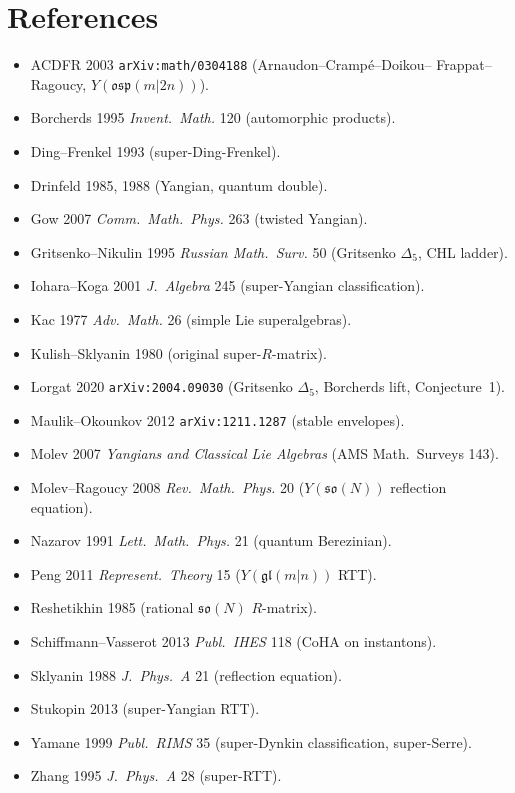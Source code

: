 \documentclass{article}
\providecommand{\fgl}{\mathfrak{gl}}
\providecommand{\fso}{\mathfrak{so}}
\providecommand{\fosp}{\mathfrak{osp}}
\theoremstyle{definition}
\begin{document}
\section*{References}

\begin{itemize}
\item ACDFR 2003 \texttt{arXiv:math/0304188} (Arnaudon--Cramp\'e--Doikou--
  Frappat--Ragoucy, $Y(\fosp(m|2n))$).
\item Borcherds 1995 \emph{Invent.\ Math.} 120 (automorphic products).
\item Ding--Frenkel 1993 (super-Ding-Frenkel).
\item Drinfeld 1985, 1988 (Yangian, quantum double).
\item Gow 2007 \emph{Comm.\ Math.\ Phys.} 263 (twisted Yangian).
\item Gritsenko--Nikulin 1995 \emph{Russian Math.\ Surv.} 50 (Gritsenko
  $\Delta_5$, CHL ladder).
\item Iohara--Koga 2001 \emph{J.\ Algebra} 245 (super-Yangian
  classification).
\item Kac 1977 \emph{Adv.\ Math.} 26 (simple Lie superalgebras).
\item Kulish--Sklyanin 1980 (original super-$R$-matrix).
\item Lorgat 2020 \texttt{arXiv:2004.09030} (Gritsenko $\Delta_5$,
  Borcherds lift, Conjecture~1).
\item Maulik--Okounkov 2012 \texttt{arXiv:1211.1287} (stable envelopes).
\item Molev 2007 \emph{Yangians and Classical Lie Algebras} (AMS
  Math.\ Surveys 143).
\item Molev--Ragoucy 2008 \emph{Rev.\ Math.\ Phys.} 20 ($Y(\fso(N))$
  reflection equation).
\item Nazarov 1991 \emph{Lett.\ Math.\ Phys.} 21 (quantum Berezinian).
\item Peng 2011 \emph{Represent.\ Theory} 15 ($Y(\fgl(m|n))$ RTT).
\item Reshetikhin 1985 (rational $\fso(N)$ $R$-matrix).
\item Schiffmann--Vasserot 2013 \emph{Publ.\ IHES} 118 (CoHA on
  instantons).
\item Sklyanin 1988 \emph{J.\ Phys.\ A} 21 (reflection equation).
\item Stukopin 2013 (super-Yangian RTT).
\item Yamane 1999 \emph{Publ.\ RIMS} 35 (super-Dynkin classification,
  super-Serre).
\item Zhang 1995 \emph{J.\ Phys.\ A} 28 (super-RTT).
\end{itemize}
\end{document}
